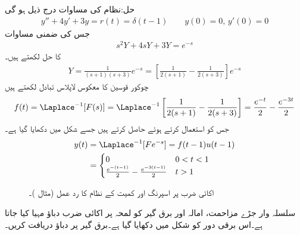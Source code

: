 حل:نظام کی مساوات درج ذیل ہو گی
\begin{align*}
y''+4y'+3y=r(t)=\delta(t-1)\quad \quad y(0)=0,\, y'(0)=0
\end{align*}
جس کی ضمنی مساوات 
\begin{align*}
s^2Y+4sY+3Y=e^{-s}
\end{align*}
کا حل لکھتے ہیں۔
\begin{align*}
Y=\frac{1}{(s+1)(s+3)}e^{-s}=\left[\frac{1}{2(s+1)}-\frac{1}{2(s+3)}\right]e^{-s}
\end{align*}
چوکور قوسین کا معکوس لاپلاس تبادل لکھتے ہیں
\begin{align*}
f(t)=\Laplace^{-1}[F(s)]=\Laplace^{-1}\left[\frac{1}{2(s+1)}-\frac{1}{2(s+3)}\right]=\frac{e^{-t}}{2}-\frac{e^{-3t}}{2}
\end{align*}
جس کو استعمال کرتے ہوئے  حاصل کرتے ہیں جسے شکل  میں دکھایا گیا ہے۔
\begin{align*}
y(t)&=\Laplace^{-1}[Fe^{-s}]=f(t-1)u(t-1)\\
&=
\begin{cases}
0& 0<t<1\\
\frac{e^{-(t-1)}}{2}-\frac{e^{-3(t-1)}}{2}& t>1
\end{cases}
\end{align*}
%
\begin{figure}
\centering
{}
\caption{اکائی ضرب پر اسپرنگ اور کمیت کے نظام کا رد عمل (مثال )۔}
\label{شکل_مثال_لاپلاس_اسپرنگ_کمیت_اکائی_ضرب_الف}
\end{figure}
سلسلہ وار جڑے مزاحمت، امالہ اور برق گیر کو لمحہ  پر  اکائی ضرب دباؤ مہیا کیا جاتا ہے۔اس برقی دور کو شکل  میں دکھایا گیا ہے۔برق گیر پر دباؤ  دریافت کریں۔ 
